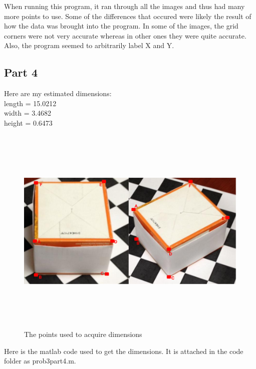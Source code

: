 \documentclass[11pt,psfig]{article}
\begin{document}
When running this program, it ran through all the images and thus had many more points to use. Some of the differences that occured were likely the result of how the data was brought into the program. In some of the images, the grid corners were not very accurate whereas in other ones they were quite accurate. Also, the program seemed to arbitrarily label X and Y. 

\newpage

\subsection*{Part 4}

Here are my estimated dimensions:\\
length = 15.0212\\
width = 3.4682\\
height = 0.6473\\

\begin{figure}[H]
\centering
\includegraphics[height=4in]{hw1prob3diagram.png}
\caption{The points used to acquire dimensions}
\end{figure}
\newpage
Here is the matlab code used to get the dimensions. It is attached in the code folder as prob3part4.m.

\end{document}
